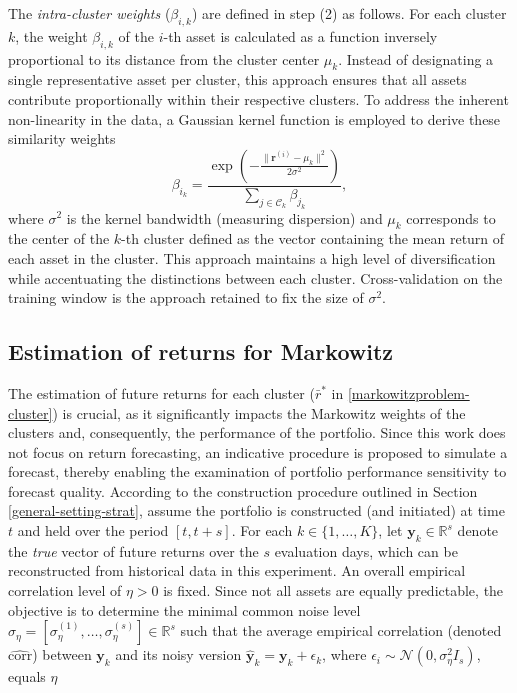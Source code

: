 \documentclass[sigconf]{acmart}
\begin{document}
The \textit{intra-cluster weights} (\(\beta_{i,k}\)) are defined in step (2) as follows. For each cluster \(k\), the weight \(\beta_{i,k}\) of the \(i\)-th asset is calculated as a function inversely proportional to its distance from the cluster center \(\mu_k\). Instead of designating a single representative asset per cluster, this approach ensures that all assets contribute proportionally within their respective clusters. To address the inherent non-linearity in the data, a Gaussian kernel function is employed to derive these similarity weights
$$
\beta_{i_k} = \frac{\exp\left(-\frac{\lVert \mathbf{r}^{(i)} - \mu_k \rVert^2}{2\sigma^2}\right)}{\sum_{j \in \mathcal{C}_k}\beta_{j_k}},
$$
\noindent where $\sigma^2$ is the kernel bandwidth (measuring dispersion) and $\mu_k$ corresponds to the center of the $k$-th cluster defined as the vector containing the mean return of each asset in the cluster. This approach maintains a high level of diversification while accentuating the distinctions between each cluster. Cross-validation on the training window is the approach retained to fix the size of $\sigma^2$.

\subsection{Estimation of returns for Markowitz}
\label{estimation-eta}
The estimation of future returns for each cluster ($\bar{r}^*$ in \eqref{markowitzproblem-cluster}) is crucial, as it significantly impacts the Markowitz weights of the clusters and, consequently, the performance of the portfolio. Since this work does not focus on return forecasting, an indicative procedure is proposed to simulate a forecast, thereby enabling the examination of portfolio performance sensitivity to forecast quality. According to the construction procedure outlined in Section \eqref{general-setting-strat}, assume the portfolio is constructed (and initiated) at time $t$ and held over the period $[t, t+s]$. For each $k \in \{1, \ldots, K\}$, let $\textbf{y}_k \in \mathbb{R}^{s}$ denote the \textit{true} vector of future returns over the $s$ evaluation days, which can be reconstructed from historical data in this experiment. An overall empirical correlation level of $\eta > 0$ is fixed. Since not all assets are equally predictable, the objective is to determine the minimal common noise level $\sigma_{\eta} = [\sigma_{\eta}^{(1)}, \ldots, \sigma_{\eta}^{(s)}] \in \mathbb{R}^{s}$ such that the average empirical correlation (denoted $\widehat{\text{corr}}$) between $\textbf{y}_k$ and its noisy version $\hat{\textbf{y}}_k = \textbf{y}_k + \epsilon_k$, where $\epsilon_i \sim \mathcal{N}(0, \sigma_{\eta}^2 I_s)$, equals $\eta$   
\end{document}
